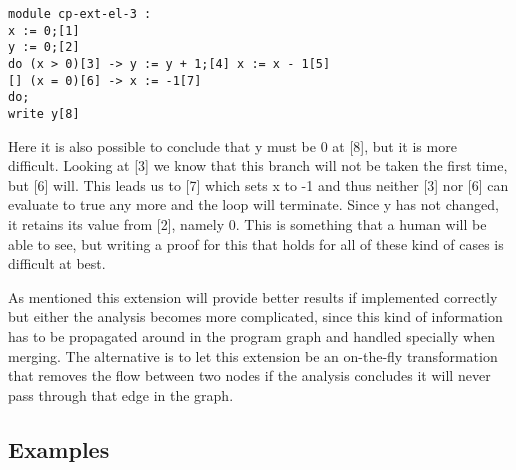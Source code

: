 \begin{lstlisting}
module cp-ext-el-3 :
x := 0;[1]
y := 0;[2]
do (x > 0)[3] -> y := y + 1;[4] x := x - 1[5]
[] (x = 0)[6] -> x := -1[7]
do;
write y[8]
\end{lstlisting}

\docpar
Here it is also possible to conclude that y must be 0 at [8], but it is more
difficult. Looking at [3] we know that this branch will not be
taken the first time, but [6] will. This leads us to [7] which sets x to -1
and thus neither [3] nor [6] can evaluate to true any more and the loop will
terminate. Since y has not changed, it retains its value from [2], namely 0.
  This is something that a human will be able to see, but writing a proof for
this that holds for all of these kind of cases is difficult at best.

\docpar
As mentioned this extension will provide better results if implemented correctly
but either the analysis becomes more complicated, since this kind of information
has to be propagated around in the program graph and handled specially when
merging.
  The alternative is to let this extension be an on-the-fly transformation that
removes the flow between two nodes if the analysis concludes it will never pass
through that edge in the graph.

\subsection{Examples}
